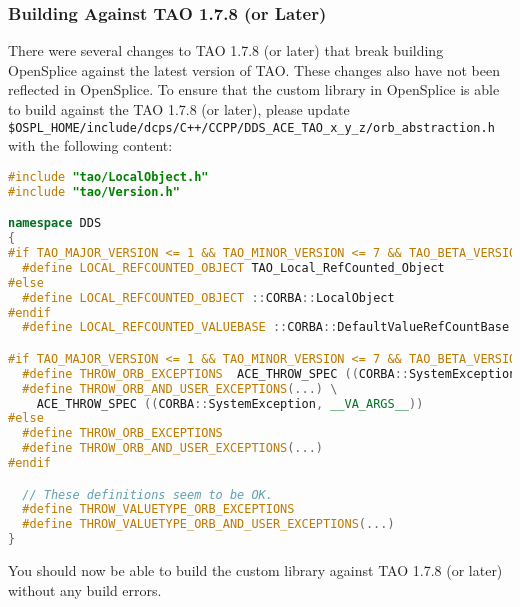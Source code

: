\subsubsection{Building Against TAO 1.7.8 (or Later)}

There were several changes to TAO 1.7.8 (or later) that break
building OpenSplice against the latest version of TAO. These
changes also have not been reflected in OpenSplice. To ensure
that the custom library in OpenSplice is able to build against
the TAO 1.7.8 (or later), please update 
\texttt{\$OSPL\_HOME/include/dcps/C++/CCPP/DDS\_ACE\_TAO\_x\_y\_z/orb\_abstraction.h}
with the following content:
\begin{lstlisting}[language=C++]
#include "tao/LocalObject.h"
#include "tao/Version.h"

namespace DDS
{
#if TAO_MAJOR_VERSION <= 1 && TAO_MINOR_VERSION <= 7 && TAO_BETA_VERSION < 8
  #define LOCAL_REFCOUNTED_OBJECT TAO_Local_RefCounted_Object
#else
  #define LOCAL_REFCOUNTED_OBJECT ::CORBA::LocalObject
#endif
  #define LOCAL_REFCOUNTED_VALUEBASE ::CORBA::DefaultValueRefCountBase

#if TAO_MAJOR_VERSION <= 1 && TAO_MINOR_VERSION <= 7 && TAO_BETA_VERSION < 8
  #define THROW_ORB_EXCEPTIONS  ACE_THROW_SPEC ((CORBA::SystemException))
  #define THROW_ORB_AND_USER_EXCEPTIONS(...) \
    ACE_THROW_SPEC ((CORBA::SystemException, __VA_ARGS__))
#else
  #define THROW_ORB_EXCEPTIONS
  #define THROW_ORB_AND_USER_EXCEPTIONS(...)
#endif

  // These definitions seem to be OK.
  #define THROW_VALUETYPE_ORB_EXCEPTIONS
  #define THROW_VALUETYPE_ORB_AND_USER_EXCEPTIONS(...)
}
\end{lstlisting}
You should now be able to build the custom library against 
TAO 1.7.8 (or later) without any build errors.
